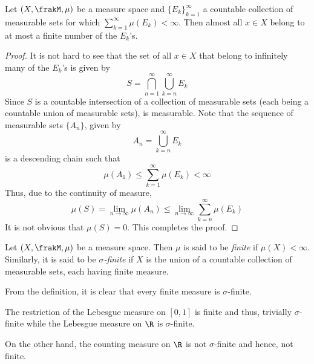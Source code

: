 \begin{lemma}
    Let $(X,\frakM,\mu)$ be a measure space and $\{E_k\}_{k = 1}^\infty$ a countable collection of measurable sets for which $\sum_{k = 1}^\infty\mu(E_k) < \infty$. Then almost all $x\in X$ belong to at most a finite number of the $E_k$'s.
\end{lemma}
\begin{proof}
    It is not hard to see that the set of all $x\in X$ that belong to infinitely many of the $E_k$'s is given by 
    \begin{equation*}
        S = \bigcap_{n = 1}^\infty\bigcup_{k = n}^\infty E_k
    \end{equation*}
    Since $S$ is a countable intersection of a collection of measurable sets (each being a countable union of measurable sets), is measurable. Note that the sequence of measurable sets $\{A_n\}$, given by
    \begin{equation*}
        A_n = \bigcup_{k = n}^\infty E_k
    \end{equation*}
    is a descending chain such that 
    \begin{equation*}
        \mu(A_1)\le\sum_{k = 1}^\infty\mu(E_k) < \infty
    \end{equation*}
    Thus, due to the continuity of measure, 
    \begin{equation*}
        \mu(S) = \lim_{n\to\infty}\mu(A_n)\le\lim_{n\to\infty}\sum_{k = n}^\infty\mu(E_k)
    \end{equation*}
    It is not obvious that $\mu(S) = 0$. This completes the proof.
\end{proof}

\begin{definition}
    Let $(X,\frakM,\mu)$ be a measure space. Then $\mu$ is said to be \textit{finite} if $\mu(X) < \infty$. Similarly, it is said to be \textit{$\sigma$-finite} if $X$ is the union of a countable collection of measurable sets, each having finite measure.
\end{definition}

From the definition, it is clear that every finite measure is $\sigma$-finite.

The restriction of the Lebesgue measure on $[0,1]$ is finite and thus, trivially $\sigma$-finite while the Lebesgue measure on $\R$ is $\sigma$-finite.

On the other hand, the counting measure on $\R$ is not $\sigma$-finite and hence, not finite.

